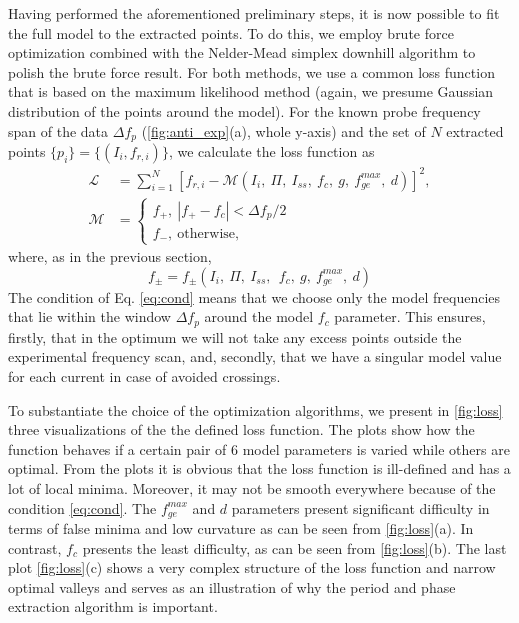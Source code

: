 \documentclass[%
 aip,
 draft,
 amsmath,amssymb,
 reprint,%
]{revtex4-1}
\begin{document}
Having performed the aforementioned preliminary steps, it is now possible to fit the full model to the extracted points. To do this, we employ brute force optimization combined with the Nelder-Mead simplex downhill algorithm\cite{nelder1965} to polish the brute force result. For both methods, we use a common loss function that is based on the maximum likelihood method (again, we presume Gaussian distribution of the points around the model). 
For the known probe frequency span of the data $\Delta f_p$ (\autoref{fig:anti_exp}(a), whole y-axis) and the set of $N$ extracted points $\{p_i\} = \{(I_i, f_{r,i})\}$, we calculate the loss function as
\begin{align}
\mathcal{L} &= \sum_{i=1}^N [f_{r,i} - \mathcal{M}(I_i,\ \Pi, \ I_{ss},\ f_c,\ g,\ f_{ge}^{max},\ d)]^2,\label{eq:loss}\\
\mathcal{M} &= \begin{cases}
f_+,\  |f_+ - f_c|< \Delta f_p/2 \\
f_-,\ \text{otherwise}, \label{eq:cond}
\end{cases}
\end{align}
where, as in the previous section, $$f_{\pm} = f_{\pm}(I_i,\ \Pi,\ I_{ss},\ \ f_c,\ g,\ f_{ge}^{max},\ d)$$
The condition of Eq. \eqref{eq:cond} means that we choose only the model frequencies that lie within the window $\Delta f_p$ around the model $f_c$ parameter. This ensures, firstly, that in the optimum we will not take any excess points outside the experimental frequency scan, and, secondly, that we have a singular model value for each current in case of avoided crossings.

To substantiate the choice of the optimization algorithms, we present in \autoref{fig:loss} three visualizations of the the defined loss function. The plots show how the function behaves if a certain pair of 6 model parameters is varied while others are optimal. From the plots it is obvious that the loss function is ill-defined and has a lot of local minima. Moreover, it may not be smooth everywhere because of the condition \eqref{eq:cond}. The $f^{max}_{ge}$ and $d$ parameters present significant difficulty in terms of false minima and low curvature as can be seen from \autoref{fig:loss}(a). In contrast, $f_c$ presents the least difficulty, as can be seen from \autoref{fig:loss}(b). The last plot \autoref{fig:loss}(c) shows a very complex structure of the loss function and narrow optimal valleys and serves as an illustration of why the period and phase extraction algorithm is important.
\end{document}
